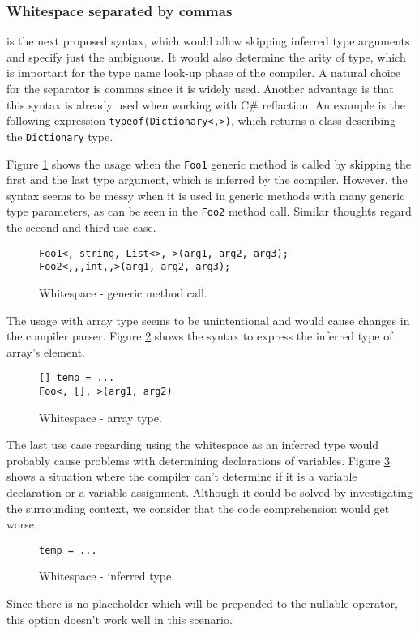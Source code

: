 \subsubsection{Whitespace separated by commas} 

is the next proposed syntax, which would allow skipping inferred type arguments and specify just the ambiguous. 
It would also determine the arity of type, which is important for the type name look-up phase of the compiler. 
A natural choice for the separator is commas since it is widely used. 
Another advantage is that this syntax is already used when working with C\# reflaction. 
An example is the following expression \texttt{typeof(Dictionary<,>)}, which returns a class describing the \texttt{Dictionary} type.
\par
Figure \ref{img45:opW1} shows the usage when the \texttt{Foo1} generic method is called by
skipping the first and the last type argument, which is inferred by the compiler. 
However, the syntax seems to be messy when it is used in generic methods with many generic type parameters, as can be seen in the \texttt{Foo2} method call. 
Similar thoughts regard the second and third use case.
\begin{figure}[h]
\begin{lstlisting}[style=csharp]
Foo1<, string, List<>, >(arg1, arg2, arg3);
Foo2<,,,int,,>(arg1, arg2, arg3);
\end{lstlisting}
\caption{Whitespace - generic method call.}
\label{img45:opW1}
\end{figure}
\par
The usage with array type seems to be unintentional and would cause changes in the compiler parser. 
Figure \ref{img46:opW4} shows the syntax to express the inferred type of array's element.
\begin{figure}[h]
\begin{lstlisting}[style=csharp]
[] temp = ...
Foo<, [], >(arg1, arg2)
\end{lstlisting}
\caption{Whitespace - array type.}
\label{img46:opW4}
\end{figure}
\par
The last use case regarding using the whitespace as an inferred type would probably cause problems with determining declarations of variables. 
Figure \ref{img47:opW5} shows a situation where the compiler can’t determine if it is a variable declaration or a variable assignment. 
Although it could be solved by investigating the surrounding context, we consider that the code comprehension would get worse.
\begin{figure}[h]
\begin{lstlisting}[style=csharp]
temp = ...
\end{lstlisting}
\caption{Whitespace - inferred type.}
\label{img47:opW5}
\end{figure}
\par
Since there is no placeholder which will be prepended to the nullable operator, this option doesn't work well in this scenario.

